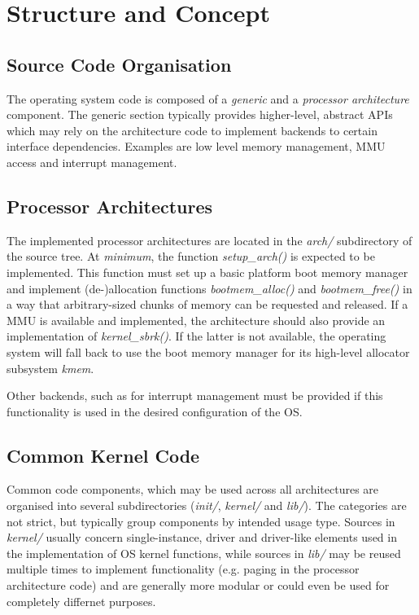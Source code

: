 \chapter {Structure and Concept}

\section {Source Code Organisation}

The operating system code is composed of a \emph{generic} and a
\emph{processor architecture} component. The generic section typically
provides higher-level, abstract APIs which may rely on the architecture code
to implement backends to certain interface dependencies. Examples are
low level memory management, \gls{MMU} access and interrupt management. \\

\section {Processor Architectures}

The implemented processor architectures are located in the \emph{arch/}
subdirectory of the source tree. At \emph{minimum}, the function
\emph{setup\_arch()} is expected to be implemented. This function must set up a
basic platform boot memory manager and implement (de-)allocation functions
\emph{bootmem\_alloc()} and \emph{bootmem\_free()} in a way that
arbitrary-sized chunks of memory can be requested and released. If a \gls{MMU}
is available and implemented, the architecture should also provide an
implementation of \emph{kernel\_sbrk()}.  If the latter is not available, the
operating system will fall back to use the boot memory manager for its
high-level allocator subsystem \emph{kmem}.

Other backends, such as for interrupt management must be provided if this
functionality is used in the desired configuration of the OS.\\


\section {Common Kernel Code}

Common code components, which may be used across all architectures are
organised into several subdirectories (\emph{init/}, \emph{kernel/} and
\emph{lib/}). The categories are not strict, but typically group components by
intended usage type. Sources in \emph{kernel/} usually concern single-instance,
driver and driver-like elements used in the implementation of OS kernel
functions, while sources in \emph{lib/} may be reused multiple times to
implement functionality (e.g. paging in the processor architecture code) and
are generally more modular or could even be used for completely differnet
purposes.


